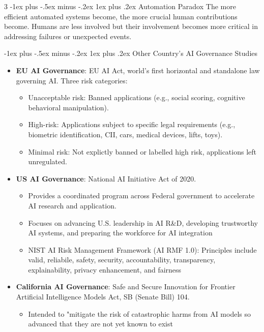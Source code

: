 \documentclass[10pt, landscape]{article}
\makeatletter
\renewcommand{\subsubsection}{\@startsection{subsubsection}{3}{0mm}%
                                {-1ex plus -.5ex minus -.2ex}%
                                {1ex plus .2ex}%
                                {\normalfont\small\bfseries}}
\makeatother
\begin{document}
\begin{multicols*}{3}
\subsubsection{Automation Paradox}
The more efficient automated systems become, the more crucial human contributions become. Humans are less involved but their involvement becomes more critical in addressing failures or unexpected events.


\subsubsection{Other Country's AI Governance Studies}
\begin{itemize}[itemsep=0pt]
\item \textbf{EU AI Governance}:  EU AI Act, world’s first horizontal and standalone law governing AI. Three risk categories:
	\begin{itemize}[itemsep=0pt]
	\item Unacceptable risk: Banned applications (e.g., social scoring, cognitive behavioral manipulation).
	\item High-risk: Applications subject to specific legal requirements (e.g., biometric identification, CII, cars, medical devices, lifts, toys).
	\item Minimal risk: Not explictly banned or labelled high risk, applications left unregulated.
	\end{itemize}
\item \textbf{US AI Governance}: National AI Initiative Act of 2020.
	\begin{itemize}[itemsep=0pt]
	\item Provides a coordinated program across Federal government to accelerate AI research and application.
	\item Focuses on advancing U.S. leadership in AI R\&D, developing trustworthy AI systems, and preparing the workforce for AI integration
	\item NIST AI Risk Management Framework (AI RMF 1.0): Principles include valid, reliabile, safety, security, accountability, transparency, explainability, privacy enhancement, and fairness
	\end{itemize}
\item \textbf{California AI Governance}:  Safe and Secure Innovation for Frontier Artificial Intelligence Models Act, SB (Senate Bill) 104. 
	\begin{itemize}[itemsep=0pt]
	\item Intended to "mitigate the risk of catastrophic harms from AI models so advanced that they are not yet known to exist

\end{itemize}
\end{itemize}
\end{multicols*}
\end{document}
